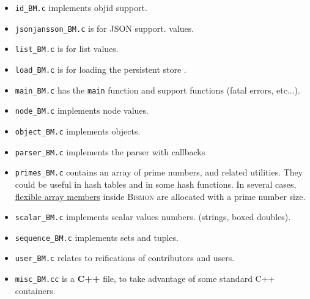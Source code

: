 \begin{itemize}
  \item \texttt{id\_BM.c} implements objid 
     support.

  \item \texttt{jsonjansson\_BM.c} is for JSON 
     support.
    values.

  \item \texttt{list\_BM.c} is for list 
      values.

  \item \texttt{load\_BM.c} is for loading the persistent store
   .

  \item \texttt{main\_BM.c} has the \texttt{main} function 
     and support functions (fatal errors, etc...).

  \item \texttt{node\_BM.c} implements node values. 

  \item \texttt{object\_BM.c} implements
    objects. 
     

  \item \texttt{parser\_BM.c} implements the parser
     with callbacks

  \item \texttt{primes\_BM.c} contains an array of prime numbers,
     and related
    utilities. They could be useful in hash tables 
    and in some hash functions. In several cases,
    \href{https://en.wikipedia.org/wiki/Flexible_array_member}{flexible
      array members} inside \textsc{Bismon} are allocated with a prime
    number size.  

  \item \texttt{scalar\_BM.c} implements scalar values
      
    numbers.  (strings,
    boxed doubles).

  \item \texttt{sequence\_BM.c} implements sets and
    tuples.

  \item \texttt{user\_BM.c} relates
     to reifications of
    contributors and  users.

  \item \texttt{misc\_BM.cc} is a \textbf{C++} file,
     to take advantage of
    some standard C++   containers.
\end{itemize}

